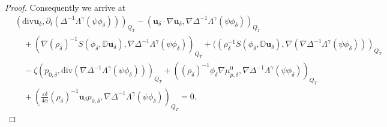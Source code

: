 \documentclass[reqno,a4paper,11pt]{amsart}
\theoremstyle{plain}
\numberwithin{equation}{section}
\begin{document}
\begin{proof}
				
				Consequently we arrive at
				\begin{align}\label{weak1111}
					&\nonumber(\mathrm{div}\mathbf{u}_{\delta},\partial_{t}(\Delta^{-1}\Lambda^{\gamma}(\psi\phi_{\delta})))_{Q_{T}}-(\mathbf{u}_{\delta}\cdot\nabla \mathbf{u}_{\delta},\nabla\Delta^{-1}\Lambda^{\gamma}(\psi\phi_{\delta}))_{Q_{T}}
					\\&\nonumber\quad+(\nabla(\rho_{\delta})^{-1}S(\phi_{\delta},\mathbb{ D}\mathbf{u}_{\delta}),\nabla\Delta^{-1}\Lambda^{\gamma}(\psi\phi_{\delta}))_{Q_{T}}+((\rho_{\delta}^{-1}S(\phi_{\delta},\mathbb{ D}\mathbf{u}_{\delta}),\nabla(\nabla\Delta^{-1}\Lambda^{\gamma}(\psi\phi_{\delta})))_{Q_{T}}
					\\&\nonumber\quad -\zeta(p_{0,\delta},\mathrm{div}(\nabla\Delta^{-1}\Lambda^{\gamma}(\psi\phi_{\delta})))_{Q_{T}}
					+((\rho_{\delta})^{-1}\phi_{\delta}\nabla\mu_{p,\delta}^{0},\nabla\Delta^{-1}\Lambda^{\gamma}(\psi\phi_{\delta}))_{Q_{T}}
					\\&\quad
					+(\frac{\varepsilon\delta}{4\alpha}(\rho_{\delta})^{-1}\mathbf{u}_{\delta}p_{0,\delta},\nabla\Delta^{-1}\Lambda^{\gamma}(\psi\phi_{\delta}))_{Q_{T}}=0.
				\end{align}
				

\end{proof}
\end{document}
